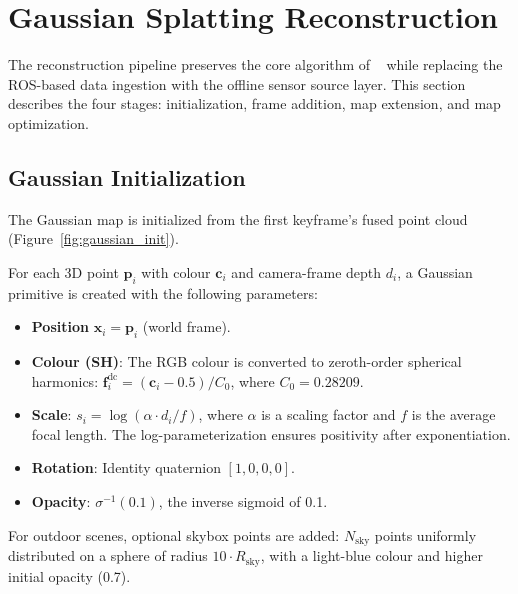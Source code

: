 \section{Gaussian Splatting Reconstruction}
\label{sec:gaussian_reconstruction}

The reconstruction pipeline preserves the core algorithm of
\gaussianlic~\cite{lang2026_gaussianlic2} while replacing the ROS-based
data ingestion with the offline sensor source layer. This section
describes the four stages: initialization, frame addition, map extension,
and map optimization.

\subsection{Gaussian Initialization}
\label{subsec:init}

The Gaussian map is initialized from the first keyframe's fused point
cloud (Figure~\ref{fig:gaussian_init}).



For each 3D point
$\mathbf{p}_i$ with colour $\mathbf{c}_i$ and camera-frame depth $d_i$,
a Gaussian primitive is created with the following parameters:

\begin{itemize}
    \item \textbf{Position} $\mathbf{x}_i = \mathbf{p}_i$ (world frame).
    \item \textbf{Colour (SH)}: The RGB colour is converted to zeroth-order
    spherical harmonics:
    $\mathbf{f}_i^{\text{dc}} = (\mathbf{c}_i - 0.5) / C_0$,
    where $C_0 = 0.28209$.
    \item \textbf{Scale}: $s_i = \log(\alpha \cdot d_i / f)$, where
    $\alpha$ is a scaling factor and $f$ is the average focal length.
    The log-parameterization ensures positivity after exponentiation.
    \item \textbf{Rotation}: Identity quaternion $[1, 0, 0, 0]$.
    \item \textbf{Opacity}: $\sigma^{-1}(0.1)$, the inverse sigmoid of 0.1.
\end{itemize}

For outdoor scenes, optional skybox points are added: $N_{\text{sky}}$
points uniformly distributed on a sphere of radius $10 \cdot R_{\text{sky}}$,
with a light-blue colour and higher initial opacity (0.7).

